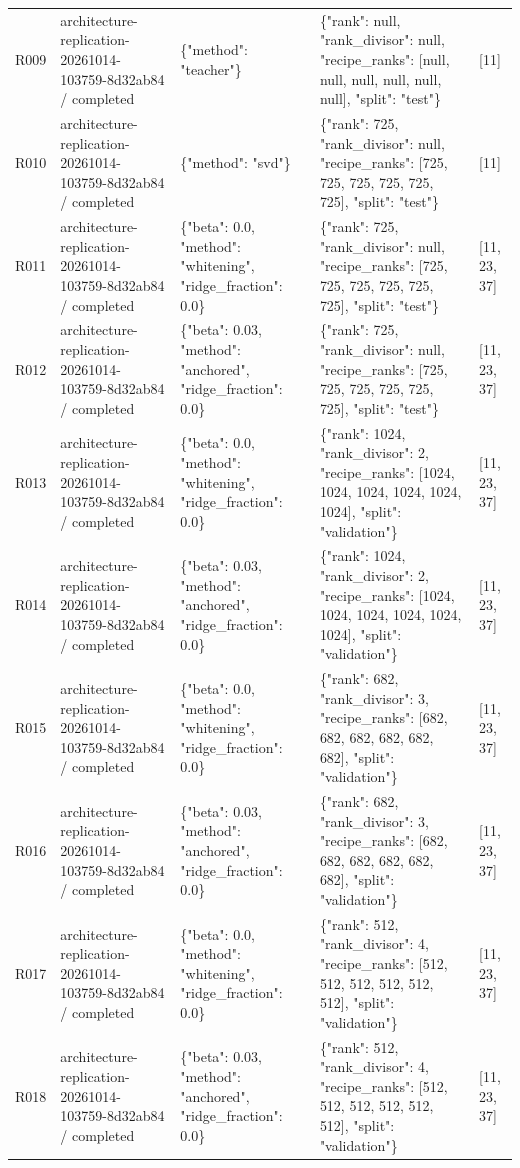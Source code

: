 \documentclass[10pt]{article}
\begin{document}
{\begin{longtable}{p{}p{}p{}p{}p{}}
R009 & architecture-replication-20261014-103759-8d32ab84 / completed & \{"method": "teacher"\} & \{"rank": null, "rank\_divisor": null, "recipe\_ranks": [null, null, null, null, null, null], "split": "test"\} & [11] \\
R010 & architecture-replication-20261014-103759-8d32ab84 / completed & \{"method": "svd"\} & \{"rank": 725, "rank\_divisor": null, "recipe\_ranks": [725, 725, 725, 725, 725, 725], "split": "test"\} & [11] \\
R011 & architecture-replication-20261014-103759-8d32ab84 / completed & \{"beta": 0.0, "method": "whitening", "ridge\_fraction": 0.0\} & \{"rank": 725, "rank\_divisor": null, "recipe\_ranks": [725, 725, 725, 725, 725, 725], "split": "test"\} & [11, 23, 37] \\
R012 & architecture-replication-20261014-103759-8d32ab84 / completed & \{"beta": 0.03, "method": "anchored", "ridge\_fraction": 0.0\} & \{"rank": 725, "rank\_divisor": null, "recipe\_ranks": [725, 725, 725, 725, 725, 725], "split": "test"\} & [11, 23, 37] \\
R013 & architecture-replication-20261014-103759-8d32ab84 / completed & \{"beta": 0.0, "method": "whitening", "ridge\_fraction": 0.0\} & \{"rank": 1024, "rank\_divisor": 2, "recipe\_ranks": [1024, 1024, 1024, 1024, 1024, 1024], "split": "validation"\} & [11, 23, 37] \\
R014 & architecture-replication-20261014-103759-8d32ab84 / completed & \{"beta": 0.03, "method": "anchored", "ridge\_fraction": 0.0\} & \{"rank": 1024, "rank\_divisor": 2, "recipe\_ranks": [1024, 1024, 1024, 1024, 1024, 1024], "split": "validation"\} & [11, 23, 37] \\
R015 & architecture-replication-20261014-103759-8d32ab84 / completed & \{"beta": 0.0, "method": "whitening", "ridge\_fraction": 0.0\} & \{"rank": 682, "rank\_divisor": 3, "recipe\_ranks": [682, 682, 682, 682, 682, 682], "split": "validation"\} & [11, 23, 37] \\
R016 & architecture-replication-20261014-103759-8d32ab84 / completed & \{"beta": 0.03, "method": "anchored", "ridge\_fraction": 0.0\} & \{"rank": 682, "rank\_divisor": 3, "recipe\_ranks": [682, 682, 682, 682, 682, 682], "split": "validation"\} & [11, 23, 37] \\
R017 & architecture-replication-20261014-103759-8d32ab84 / completed & \{"beta": 0.0, "method": "whitening", "ridge\_fraction": 0.0\} & \{"rank": 512, "rank\_divisor": 4, "recipe\_ranks": [512, 512, 512, 512, 512, 512], "split": "validation"\} & [11, 23, 37] \\
R018 & architecture-replication-20261014-103759-8d32ab84 / completed & \{"beta": 0.03, "method": "anchored", "ridge\_fraction": 0.0\} & \{"rank": 512, "rank\_divisor": 4, "recipe\_ranks": [512, 512, 512, 512, 512, 512], "split": "validation"\} & [11, 23, 37] \\
\end{longtable}}
\end{document}
